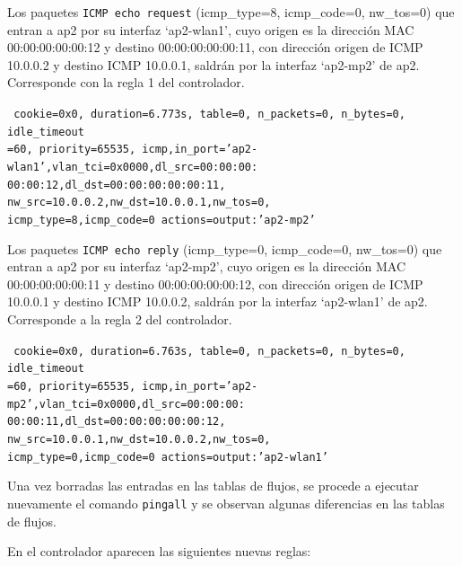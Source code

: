 \documentclass[a4paper,12pt,twoside,spanish]{book}
\begin{document}
Los paquetes \texttt{ICMP echo request} (icmp\_type=8, icmp\_code=0, nw\_tos=0) que entran a ap2 por su interfaz ‘ap2-wlan1’, cuyo origen es la dirección MAC 00:00:00:00:00:12 y destino 00:00:00:00:00:11, con dirección origen de ICMP 10.0.0.2 y destino ICMP 10.0.0.1, saldrán por la interfaz ‘ap2-mp2’ de ap2. Corresponde con la regla 1 del controlador.\par 

\noindent\texttt{
	cookie=0x0, duration=6.773s, table=0, n\_packets=0, n\_bytes=0, idle\_timeout\\
	=60, priority=65535,
	icmp,in\_port='ap2-wlan1',vlan\_tci=0x0000,dl\_src=00:00:00:\\
	00:00:12,dl\_dst=00:00:00:00:00:11,
	nw\_src=10.0.0.2,nw\_dst=10.0.0.1,nw\_tos=0,\\
	icmp\_type=8,icmp\_code=0 actions=output:'ap2-mp2'
}

Los paquetes \texttt{ICMP echo reply} (icmp\_type=0, icmp\_code=0, nw\_tos=0) que entran a ap2 por su interfaz ‘ap2-mp2’, cuyo origen es la dirección MAC 00:00:00:00:00:11 y destino 00:00:00:00:00:12, con dirección origen de ICMP 10.0.0.1 y destino ICMP 10.0.0.2, saldrán por la interfaz ‘ap2-wlan1’ de ap2. Corresponde a la regla 2 del controlador. \par 

\noindent\texttt{
	cookie=0x0, duration=6.763s, table=0, n\_packets=0, n\_bytes=0, idle\_timeout\\
	=60, priority=65535,
	icmp,in\_port='ap2-mp2',vlan\_tci=0x0000,dl\_src=00:00:00:\\
	00:00:11,dl\_dst=00:00:00:00:00:12,
	nw\_src=10.0.0.1,nw\_dst=10.0.0.2,nw\_tos=0,\\
	icmp\_type=0,icmp\_code=0 actions=output:'ap2-wlan1'
}

Una vez borradas las entradas en las tablas de flujos, se procede a ejecutar nuevamente el comando \texttt{pingall} y se observan algunas diferencias en las tablas de flujos.\par 

En el controlador aparecen las siguientes nuevas reglas:\par
\end{document}
